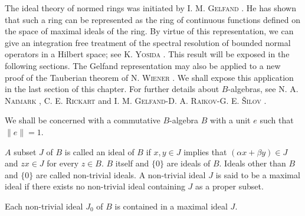 The ideal theory of normed rings was initiated by I. M. \textsc{Gelfand} \cite{gelfand76b}. He has shown that such a ring can be represented as the ring of continuous functions defined on the space of maximal ideals of the ring. By virtue of this representation, we can give an integration free treatment of the spectral resolution of bounded normal operators in a Hilbert space; see K. \textsc{Yosida} \cite{yosida355}. This result will be exposed in the following sections. The Gelfand representation may also be applied to a new proof of the Tauberian theorem of N. \textsc{Wiener} \cite{wiener340}. We shall expose this application in the last section of this chapter. For further details about $B$-algebras, see N. A. \textsc{Naimark} \cite{naimark221}, C. E. \textsc{Rickart} \cite{rickart271} and I. M. \textsc{Gelfand}-D. A. \textsc{Raikov}-G. E. \textsc{Šilov} \cite{gelfand79}. 


\label{sec:XI.1}

We shall be concerned with a commutative $B$-algebra $B$ with a unit $e$ such that $\| e \| = 1$. 

\begin{definition}\label{def:XI.1.Definition.1} $A$ subset $J$ of $B$ is called an ideal of $B$ if $x, y \in J$ implies that $(\alpha x + \beta y) \in J$ and $zx \in J$ for every $z \in B$. $B$ itself and $\{0\}$ are ideals of $B$. Ideals other than $B$ and $\{0\}$ are called non-trivial ideals. A non-trivial ideal $J$ is said to be a maximal ideal if there exists no non-trivial ideal containing $J$ as a proper subset. 
\end{definition}

\begin{proposition}\label{prop:XI.1.Proposition.1} Each non-trivial ideal $J_0$ of $B$ is contained in a maximal ideal $J$. 
\end{proposition}

